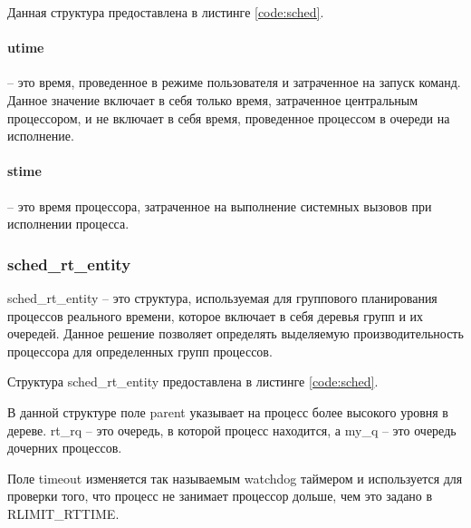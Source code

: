 Данная структура предоставлена в листинге \ref{code:sched}.


\paragraph*{utime} -- это время, проведенное в режиме пользователя и затраченное на запуск команд. Данное значение включает в себя только время, затраченное центральным процессором, и не включает в себя время, проведенное процессом в очереди на исполнение.

\paragraph*{stime} -- это время процессора, затраченное на выполнение системных вызовов при исполнении процесса.

\subsubsection{sched\_rt\_entity} 
sched\_rt\_entity -- это структура, используемая для группового планирования процессов реального времени, которое включает в себя деревья групп и их очередей. Данное решение позволяет определять выделяемую производительность процессора для определенных групп процессов.

Структура sched\_rt\_entity предоставлена в листинге \ref{code:sched}.


В данной структуре поле parent указывает на процесс более высокого уровня в дереве. rt\_rq -- это очередь, в которой процесс находится, а my\_q -- это очередь дочерних процессов.

Поле timeout изменяется так называемым watchdog таймером и используется для проверки того, что процесс не занимает процессор дольше, чем это задано в RLIMIT\_RTTIME.

